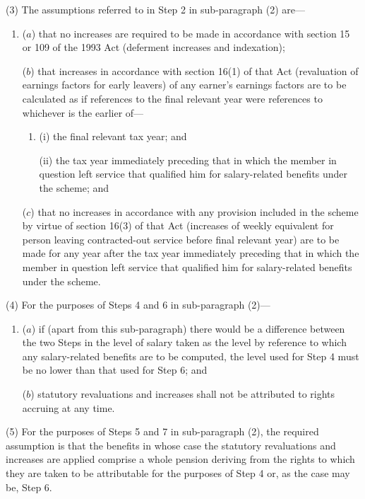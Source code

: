 \documentclass[12pt,a4paper]{article}
\begin{document}
(3) The assumptions referred to in Step 2 in sub-paragraph (2)  are—
\begin{enumerate}\item[]
($a$) that no increases are required to be made in accordance with section 15 or 109 of the 1993 Act (deferment increases and indexation);

($b$) that increases in accordance with section 16(1)  of that Act (revaluation of earnings factors for early leavers) of any earner’s earnings factors are to be calculated as if references to the final relevant year were references to whichever is the earlier of—
\begin{enumerate}\item[]
(i) the final relevant tax year; and

(ii) the tax year immediately preceding that in which the member in question left service that qualified him for salary-related benefits under the scheme; and
\end{enumerate}

($c$) that no increases in accordance with any provision included in the scheme by virtue of section 16(3)  of that Act (increases of weekly equivalent for person leaving contracted-out service before final relevant year) are to be made for any year after the tax year immediately preceding that in which the member in question left service that qualified him for salary-related benefits under the scheme.
\end{enumerate}

(4) For the purposes of Steps 4 and 6 in sub-paragraph (2)—
\begin{enumerate}\item[]
($a$) if (apart from this sub-paragraph) there would be a difference between the two Steps in the level of salary taken as the level by reference to which any salary-related benefits are to be computed, the level used for Step 4 must be no lower than that used for Step 6; and

($b$) statutory revaluations and increases shall not be attributed to rights accruing at any time.
\end{enumerate}

(5) For the purposes of Steps 5 and 7 in sub-paragraph (2), the required assumption is that the benefits in whose case the statutory revaluations and increases are applied comprise a whole pension deriving from the rights to which they are taken to be attributable for the purposes of Step 4 or, as the case may be, Step 6. 
\end{document}
